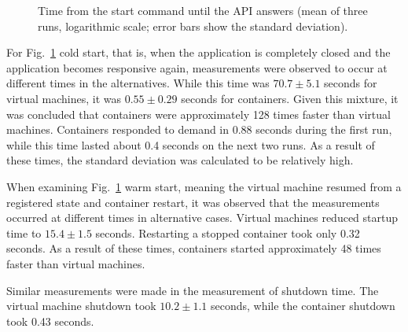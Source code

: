 \documentclass[conference,a4paper]{IEEEtran}
\begin{document}
\begin{figure}[htbp]
	\centering
	\caption{Time from the start command until the API answers (mean of three runs, logarithmic scale; error bars show the standard deviation).}
	\label{fig:start}
\end{figure}

For Fig.~\ref{fig:start} cold start, that is, when the application is completely closed and the application becomes responsive again, measurements were observed to occur at different times in the alternatives. While this time was $70.7 \pm 5.1$ seconds for virtual machines, it was $0.55 \pm 0.29$ seconds for containers. Given this mixture, it was concluded that containers were approximately 128 times faster than virtual machines. Containers responded to demand in 0.88 seconds during the first run, while this time lasted about 0.4 seconds on the next two runs. As a result of these times, the standard deviation was calculated to be relatively high.

When examining Fig.~\ref{fig:start} warm start, meaning the virtual machine resumed from a registered state and container restart, it was observed that the measurements occurred at different times in alternative cases. Virtual machines reduced startup time to $15.4 \pm 1.5$ seconds. Restarting a stopped container took only 0.32 seconds. As a result of these times, containers started approximately 48 times faster than virtual machines.

Similar measurements were made in the measurement of shutdown time. The virtual machine shutdown took $10.2 \pm 1.1$ seconds, while the container shutdown took 0.43 seconds.
\end{document}
